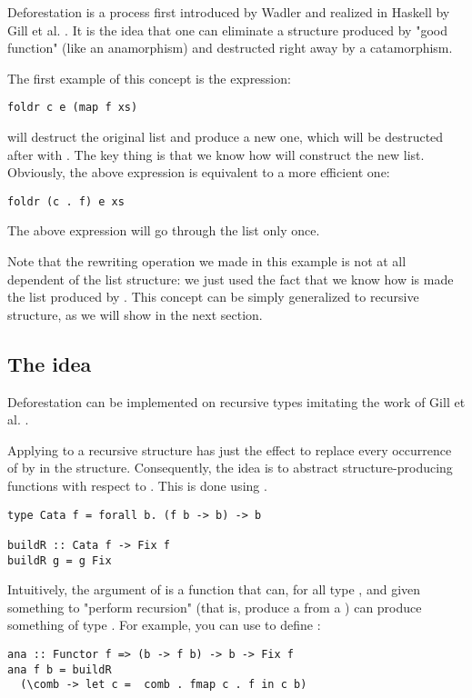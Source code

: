 
Deforestation is a process first introduced by Wadler \cite{WADLER1990231} and realized in Haskell by Gill et al. \cite{Gill:1993:SCD:165180.165214}. It is the idea that one can eliminate a structure produced by "good function" (like an anamorphism) and destructed right away by a catamorphism.

The first example of this concept is the expression:
\begin{verbatim}
foldr c e (map f xs)
\end{verbatim}
 will destruct the original list and produce a new one, which will be destructed after with . The key thing is that we know how  will construct the new list. Obviously, the above expression is equivalent to a more efficient one:
\begin{verbatim}
foldr (c . f) e xs
\end{verbatim}
The above expression will go through the list only once.

Note that the rewriting operation we made in this example is not at all dependent of the list structure: we just used the fact that we know how is made the list produced by . This concept can be simply generalized to recursive structure, as we will show in the next section.


\subsection{The idea}
Deforestation can be implemented on recursive types imitating the work of Gill et al. \cite{Gill:1993:SCD:165180.165214}.

Applying  to a recursive structure has just the effect to replace every occurrence of  by  in the structure. Consequently, the idea is to abstract structure-producing functions with respect to . This is done using .

\begin{verbatim}
type Cata f = forall b. (f b -> b) -> b

buildR :: Cata f -> Fix f
buildR g = g Fix
\end{verbatim}

Intuitively, the argument of  is a function that can, for all type , and given something to "perform recursion" (that is, produce a  from a ) can produce something of type . For example, you can use  to define :
\begin{verbatim}
ana :: Functor f => (b -> f b) -> b -> Fix f
ana f b = buildR
  (\comb -> let c =  comb . fmap c . f in c b)
\end{verbatim}

